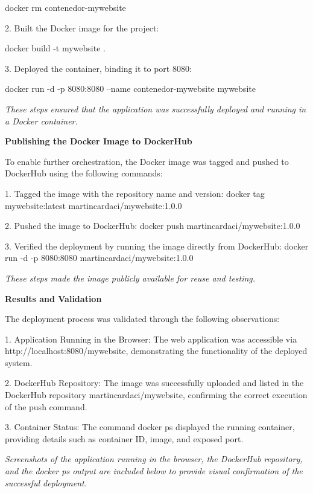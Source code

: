 \documentclass[sigconf]{acmart}
\begin{document}
docker rm contenedor-mywebsite
    
    2. Built the Docker image for the project:

docker build -t mywebsite .

    3. Deployed the container, binding it to port 8080:
    
docker run -d -p 8080:8080 --name contenedor-mywebsite mywebsite
       
\textit{These steps ensured that the application was successfully deployed and running in a Docker container.}


\vspace{0,5cm}
\textbf{Publishing the Docker Image to DockerHub}

To enable further orchestration, the Docker image was tagged and pushed to DockerHub using the following commands:

    1. Tagged the image with the repository name and version:
       docker tag mywebsite:latest martincardaci/mywebsite:1.0.0

    2. Pushed the image to DockerHub:
       docker push martincardaci/mywebsite:1.0.0
    
    3. Verified the deployment by running the image directly from DockerHub:
       docker run -d -p 8080:8080 martincardaci/mywebsite:1.0.0

\textit{These steps made the image publicly available for reuse and testing.}

\vspace{0,5cm}
\textbf{Results and Validation}

The deployment process was validated through the following observations:

    1. Application Running in the Browser: The web application was accessible via http://localhost:8080/mywebsite, demonstrating the functionality of the deployed system.
    
    2. DockerHub Repository: The image was successfully uploaded and listed in the DockerHub repository martincardaci/mywebsite, confirming the correct execution of the push command.

    3. Container Status: The command docker ps displayed the running container, providing details such as container ID, image, and exposed port.

\textit{Screenshots of the application running in the browser, the DockerHub repository, and the docker ps output are included below to provide visual confirmation of the successful deployment.}
\end{document}
